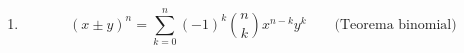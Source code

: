 \begin{enumerate}[label=\alph*)]
  
  \item \[(x\pm y)^n = \sum_{k=0}^{n} (-1)^k \binom{n}{k} x^{n-k}y^k \qquad \text{(Teorema binomial)}\]
\end{enumerate}